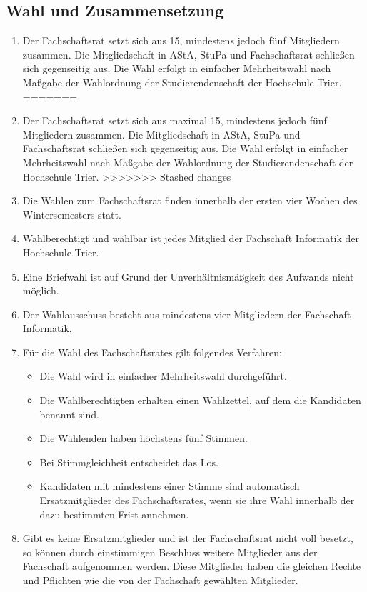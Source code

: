 \subsection{Wahl und Zusammensetzung}
\label{sec:zusammensetzung}
\begin{enumerate}
<<<<<<< Updated upstream
\item Der Fachschaftsrat setzt sich aus 15, mindestens jedoch fünf Mitgliedern zusammen. Die Mitgliedschaft in AStA, StuPa und Fachschaftsrat schließen sich gegenseitig aus. Die Wahl erfolgt in einfacher Mehrheitswahl nach Maßgabe der Wahlordnung der Studierendenschaft der Hochschule Trier.
=======
\item \label{maxSum} Der Fachschaftsrat setzt sich aus maximal 15, mindestens jedoch fünf Mitgliedern zusammen. Die Mitgliedschaft in AStA, StuPa und Fachschaftsrat schließen sich gegenseitig aus. Die Wahl erfolgt in einfacher Mehrheitswahl nach Maßgabe der Wahlordnung der Studierendenschaft der Hochschule Trier.
>>>>>>> Stashed changes
\item Die Wahlen zum Fachschaftsrat finden innerhalb der ersten vier Wochen des Wintersemesters statt.
\item Wahlberechtigt und wählbar ist jedes Mitglied der Fachschaft Informatik der Hochschule Trier.
\item Eine Briefwahl ist auf Grund der Unverhältnismäßgkeit des Aufwands nicht möglich.
\item Der Wahlausschuss besteht aus mindestens vier Mitgliedern der Fachschaft Informatik.
\item Für die Wahl des Fachschaftsrates gilt folgendes Verfahren:
\begin{itemize}
\item Die Wahl wird in einfacher Mehrheitswahl durchgeführt.
\item Die Wahlberechtigten erhalten einen Wahlzettel, auf dem die Kandidaten benannt sind.
\item Die Wählenden haben höchstens fünf Stimmen.
\item Bei Stimmgleichheit entscheidet das Los.
\item Kandidaten mit mindestens einer Stimme sind automatisch Ersatzmitglieder des Fachschaftsrates, wenn sie ihre Wahl innerhalb der dazu bestimmten Frist annehmen.
\end{itemize}
\item \label{ersatz} Gibt es keine Ersatzmitglieder und ist der Fachschaftsrat nicht voll besetzt, so können durch einstimmigen Beschluss weitere Mitglieder aus der Fachschaft aufgenommen werden. Diese Mitglieder haben die gleichen Rechte und Pflichten wie die von der Fachschaft gewählten Mitglieder.

\end{enumerate}
